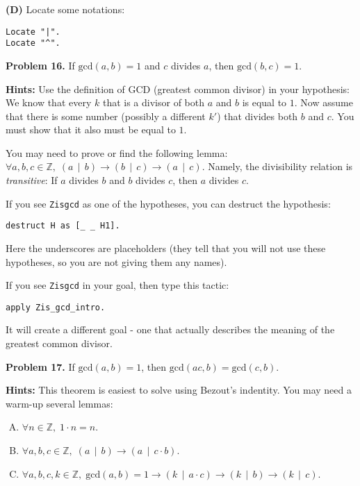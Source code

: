 \documentclass[jou]{apa6}
\begin{document}
\vspace{6pt}
{\bf (D)} Locate some notations: 

\begin{verbatim}
Locate "|".
Locate "^".
\end{verbatim}




\vspace{20pt}
{\bf Problem 16.} If $\text{gcd}(a,b)=1$ and $c$ divides $a$, then $\text{gcd}(b,c)=1$.

{\bf Hints:} Use the definition of GCD (greatest common divisor) in your hypothesis: We know that every $k$ that is a divisor of 
both $a$ and $b$ is equal to $1$. 
Now assume that there is some number (possibly a different $k'$) that divides both $b$ and $c$. 
You must show that it also must be equal to $1$. 

You may need to prove or find the following lemma:\\
$\forall a,b,c \in \mathbb{Z},\; (a \,\mid\, b) \rightarrow (b \,\mid\,  c) \rightarrow (a \,\mid\, c)$.
Namely, the divisibility relation is {\em transitive}: If $a$ divides $b$ and $b$ divides $c$, then 
$a$ divides $c$. 

If you see {\tt Zis\textunderscore{}gcd} as one of the hypotheses, you can destruct the hypothesis:
\begin{verbatim}
destruct H as [_ _ H1].
\end{verbatim}
Here the underscores are placeholders (they tell that you will not use these hypotheses, so you are not
giving them any names). 

If you see {\tt Zis\textunderscore{}gcd} in your goal, then type this tactic: 
\begin{verbatim}
apply Zis_gcd_intro.
\end{verbatim}
It will create a different goal - one that actually describes the meaning of the
greatest common divisor. 





\vspace{20pt}
{\bf Problem 17.} If $\text{gcd}(a,b)=1$, then 
$\text{gcd}(ac,b)=\text{gcd}(c,b)$. 

{\bf Hints:} This theorem is easiest to solve using Bezout's indentity. 
You may need a warm-up \textendash{} several lemmas:

\begin{enumerate}[(A)]
\item $\forall n \in \mathbb{Z},\; 1 \cdot n = n$.
\item $\forall a, b, c \in \mathbb{Z},\; (a \,\mid\, b) \rightarrow (a \,\mid\, c \cdot b)$.
\item $\forall a,b,c,k \in \mathbb{Z},\; 
\text{gcd}(a,b) = 1 \rightarrow (k \,\mid\, a \cdot c) \rightarrow (k \,\mid\, b) \rightarrow (k \,\mid\, c)$.
\end{enumerate}
\end{document}

